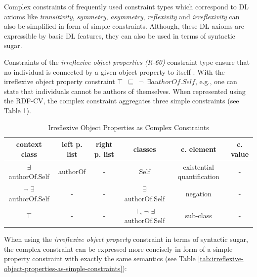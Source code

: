 \documentclass[a4paper,fontsize=11pt]{scrartcl}
\newcommand{\ms}[1]{\texttt{#1}}
\begin{document}
Complex constraints of frequently used constraint types which correspond to DL axioms like \emph{transitivity}, \emph{symmetry}, \emph{asymmetry}, \emph{reflexivity} and \emph{irreflexivity} can also be simplified in form of simple constraints. Although, these DL axioms are expressible by basic DL features, they can also be used in terms of syntactic sugar.

Constraints of the \emph{irreflexive object properties (R-60)} constraint type ensure that no individual is connected by a given object property to itself \cite{Kroetzsch2012}. With the irreflexive object property constraint {\small\ms{$\top$ $\sqsubseteq$ $\neg$ $\exists authorOf.Self$}}, e.g., one can state that individuals cannot be authors of themselves. When represented using the RDF-CV, the complex constraint aggregates three simple constraints (see Table \ref{tab:irreflexive-object-properties-as-complex-constraints}).


\begin{table}[H]
  \scriptsize
  \sffamily
  \vspace{0cm}
	\caption{Irreflexive Object Properties as Complex Constraints}
	\label{tab:irreflexive-object-properties-as-complex-constraints}
	\centering
		\begin{tabular}{c|c|c|c|c|c}
      \textbf{context class} & \textbf{left p. list} & \textbf{right p. list} & \textbf{classes} & \textbf{c. element} & \textbf{c. value} \\
      \hline
$\exists$ authorOf.Self & authorOf & - & Self & existential quantification & - \\
$\neg$ $\exists$ authorOf.Self & - & - & $\exists$ authorOf.Self & negation & - \\
$\top$ & - & - & $\top$, $\neg$ $\exists$ authorOf.Self & sub-class & - \\
		\end{tabular}
\end{table}

When using the \emph{irreflexive object property} constraint in terms of syntactic sugar, 
the complex constraint can be expressed more concisely in form of a simple property constraint with exactly the same semantics (see Table \ref{tab:irreflexive-object-properties-as-simple-constraints}):
\end{document}
